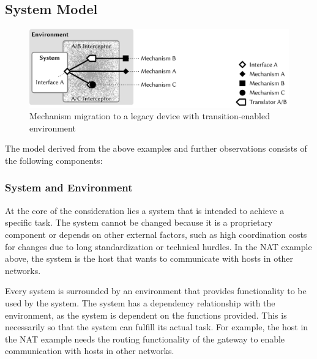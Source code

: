 \subsection{System Model}
\begin{figure}
    \centering
    \includegraphics[width=\linewidth]{figures/MechanismMigration.pdf}
    \caption{Mechanism migration to a legacy device with transition-enabled environment}
    \label{fig:bigpicture}
\end{figure}

The model derived from the above examples and further observations consists of the following components:


\subsubsection{System and Environment}
At the core of the consideration lies a system that is intended to achieve a specific task.
The system cannot be changed because it is a proprietary component or depends on other external factors, such as high coordination costs for changes due to long standardization or technical hurdles.
In the NAT example above, the system is the host that wants to communicate with hosts in other networks.

Every system is surrounded by an environment that provides functionality to be used by the system.
The system has a dependency relationship with the environment, as the system is dependent on the functions provided.
This is necessarily so that the system can fulfill its actual task.
For example, the host in the NAT example needs the routing functionality of the gateway to enable communication with hosts in other networks.

